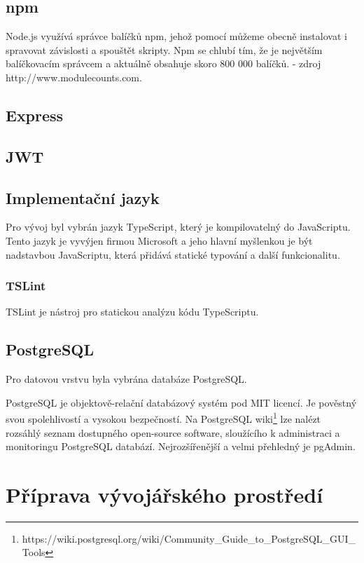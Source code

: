 \documentclass[thesis=B,czech]{FITthesis}[2012/06/26]
\begin{document}
        \subsection{npm}
            Node.js využívá správce balíčků npm, jehož pomocí můžeme obecně instalovat i spravovat závislosti a spouštět skripty. Npm se chlubí tím, že je největším balíčkovacím správcem a aktuálně obsahuje skoro 800 000 balíčků. - zdroj http://www.modulecounts.com.
        \subsection{Express}
        \subsection{JWT}
        \subsection{Implementační jazyk}
            Pro vývoj byl vybrán jazyk TypeScript, který je kompilovatelný do JavaScriptu. Tento jazyk je vyvýjen firmou Microsoft a jeho hlavní myšlenkou je být nadstavbou JavaScriptu, která přidává statické typování a další funkcionalitu.
            
        \subsubsection{TSLint}
            TSLint je nástroj pro statickou analýzu kódu TypeScriptu.
            
        \subsection{PostgreSQL}
            Pro datovou vrstvu byla vybrána databáze PostgreSQL.
            
            PostgreSQL je objektově-relační databázový systém pod MIT licencí. Je pověstný svou spolehlivostí a vysokou bezpečností. Na PostgreSQL wiki\footnote{https://wiki.postgresql.org/wiki/Community_Guide_to_PostgreSQL_GUI_Tools} lze nalézt rozsáhlý seznam dostupného open-source software, sloužícího k administraci a monitoringu PostgreSQL databází. Nejrozšířenější a velmi přehledný je pgAdmin.
            
    \section{Příprava vývojářského prostředí}
\end{document}
